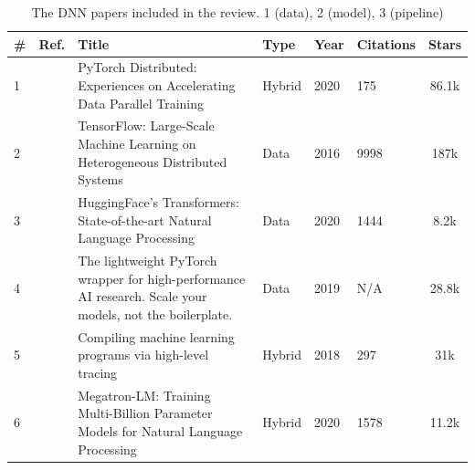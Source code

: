 \begin{table}[htbp]
	\centering
	\caption{The DNN papers included in the review. 1 (data), 2 (model), 3 (pipeline)}
	\label{tab:dnn_papers}
	\begin{tabular}{llp{8.4cm}lllc}
		\hline
		\small \textbf{\#} & \small \textbf{Ref.}                    & \small \textbf{Title}                                                                                            & \small \textbf{Type} & \small \textbf{Year} & \small \textbf{Citations} & \small \textbf{Stars}                                                \\[1ex]
		\hline
		\small 1           & \small \cite{li_pytorch_2020}           & \small PyTorch Distributed: Experiences on Accelerating Data Parallel Training                                   & \small Hybrid        & \small 2020          & \small 175                & \small 86.1k \cite{noauthor_pytorchpytorch_nodate}                   \\[1ex]
		\small 2           & \small \cite{abadi_tensorflow_2016}     & \small TensorFlow: Large-Scale Machine Learning on Heterogeneous Distributed Systems                             & \small Data          & \small 2016          & \small 9998               & \small 187k \cite{abadi_tensorflow_2015}                             \\[1ex]
		\small 3           & \small \cite{wolf_huggingfaces_2020}    & \small HuggingFace's Transformers: State-of-the-art Natural Language Processing                                  & \small Data          & \small 2020          & \small 1444               & \small 8.2k \cite{noauthor_huggingfaceaccelerate_2025}               \\[1ex]
		\small 4           & \small \cite{noauthor_overview_nodate}  & \small The lightweight PyTorch wrapper for high-performance AI research. Scale your models, not the boilerplate. & \small Data          & \small 2019          & \small N/A                & \small 28.8k \cite{falcon_pytorch_2019}                              \\[1ex]
		\small 5           & \small \cite{frostig_compiling_nodate}  & \small Compiling machine learning programs via high-level tracing                                                & \small Hybrid        & \small 2018          & \small 297                & \small 31k \cite{noauthor_jax-mljax_2025}                            \\[1ex]
		\small 6           & \small \cite{shoeybi_megatron-lm_2020}  & \small Megatron-LM: Training Multi-Billion Parameter Models for Natural Language Processing                      & \small Hybrid        & \small 2020          & \small 1578               & \small 11.2k \cite{noauthor_nvidiamegatron-lm_2025}                  \\[1ex]

\end{tabular}
\end{table}
